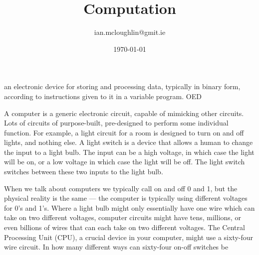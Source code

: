 \documentclass{notes}
\title{Computation}
\author{ian.mcloughlin@gmit.ie}
\date{\today}
\begin{document}
  

  

    
 
 
  \begin{definition}[Hello] an electronic device for storing and processing data, typically in binary form, according to instructions given to it in a variable program. OED
  \end{definition}

  A computer is a generic electronic circuit, capable of mimicking other circuits.
  Lots of circuits of purpose-built, pre-designed to perform some individual function.
  For example, a light circuit for a room is designed to turn on and off lights, and nothing else.
  A light switch is a device that allows a human to change the input to a light bulb.
  The input can be a high voltage, in which case the light will be on, or a low voltage in which case the light will be off.
  The light switch switches between these two inputs to the light bulb.

  When we talk about computers we typically call on and off 0 and 1, but the physical reality is the same --- the computer is typically using different voltages for 0's and 1's.
  Where a light bulb might only essentially have one wire which can take on two different voltages, computer circuits might have tens, millions, or even billions of wires that can each take on two different voltages.
  The Central Processing Unit (CPU), a crucial device in your computer, might use a sixty-four wire circuit.
  In how many different ways can sixty-four on-off switches be 



  
\end{document}
